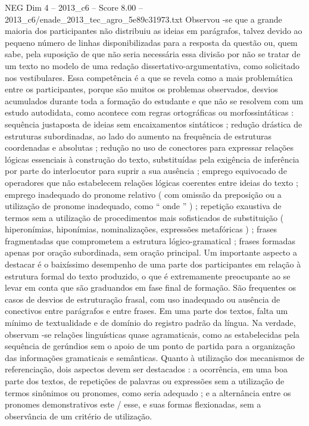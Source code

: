 \begin{textsample}{NEG Dim 4 – 2013\_c6 – Score 8.00 – 2013\_c6/enade\_2013\_tec\_agro\_5e89c31973.txt}
Observou -se que a grande maioria dos participantes não distribuiu as ideias em parágrafos, talvez devido ao pequeno número de linhas disponibilizadas para a resposta da questão ou, quem sabe, pela suposição de que não seria necessária essa divisão por não se tratar de um texto no modelo de uma redação dissertativo-argumentativa, como solicitado nos vestibulares.
Essa competência é a que se revela como a mais problemática entre os participantes, porque são muitos os problemas observados, desvios acumulados durante toda a formação do estudante e que não se resolvem com um estudo autodidata, como acontece com regras ortográficas ou morfossintáticas : sequência justaposta de ideias sem encaixamentos sintáticos ; redução drástica de estruturas subordinadas, ao lado do aumento na frequência de estruturas coordenadas e absolutas ; redução no uso de conectores para expressar relações lógicas essenciais à construção do texto, substituídas pela exigência de inferência por parte do interlocutor para suprir a sua ausência ; emprego equivocado de operadores que não estabelecem relações lógicas coerentes entre ideias do texto ; emprego inadequado do pronome relativo ( com omissão da preposição ou a utilização de pronome inadequado, como “ onde ” ) ; repetição exaustiva de termos sem a utilização de procedimentos mais sofisticados de substituição ( hiperonímias, hiponímias, nominalizações, expressões metafóricas ) ; frases fragmentadas que comprometem a estrutura lógico-gramatical ; frases formadas apenas por oração subordinada, sem oração principal.
Um importante aspecto a destacar é o baixíssimo desempenho de uma parte dos participantes em relação à estrutura formal do texto produzido, o que é extremamente preocupante ao se levar em conta que são graduandos em fase final de formação.
São frequentes os casos de desvios de estruturação frasal, com uso inadequado ou ausência de conectivos entre parágrafos e entre frases.
Em uma parte dos textos, falta um mínimo de textualidade e de domínio do registro padrão da língua.
Na verdade, observam -se relações linguísticas quase agramaticais, como as estabelecidas pela sequência de gerúndios sem o apoio de um ponto de partida para a organização das informações gramaticais e semânticas.
Quanto à utilização dos mecanismos de referenciação, dois aspectos devem ser destacados : a ocorrência, em uma boa parte dos textos, de repetições de palavras ou expressões sem a utilização de termos sinônimos ou pronomes, como seria adequado ; e a alternância entre os pronomes demonstrativos este / esse, e suas formas flexionadas, sem a observância de um critério de utilização.

\end{textsample}
